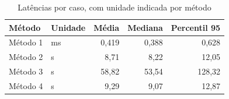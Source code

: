 \begin{table}[htbp]
\centering
\small
\caption{Latências por caso, com unidade indicada por método}
\label{tab:latencias_atuais}
\begin{tabular}{llrrr}
\hline
Método & Unidade & Média & Mediana & Percentil 95 \\
\hline
Método 1 & ms & 0,419 & 0,388 & 0,628 \\
Método 2 & s & 8,71 & 8,22 & 12,05 \\
Método 3 & s & 58,82 & 53,54 & 128,32 \\
Método 4 & s & 9,29 & 9,07 & 12,87 \\
\hline
\end{tabular}
\end{table}
